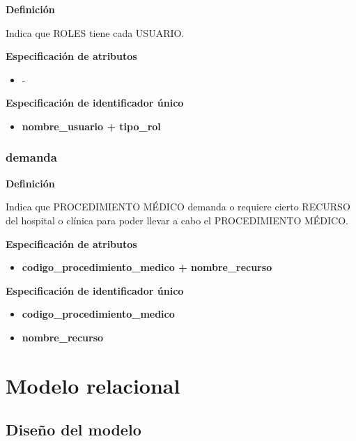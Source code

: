 \documentclass[a4paper,11pt]{article}
\begin{document}
\textbf{Definición}

Indica que ROLES tiene cada USUARIO.

\textbf{Especificación de atributos}

\begin{itemize}
\item -
\end{itemize}

\textbf{Especificación de identificador único}

\begin{itemize}

      \item \textbf{nombre\_usuario + tipo\_rol}

    
\end{itemize}

\subsubsection{\textbf{demanda}}

\textbf{Definición}

Indica que PROCEDIMIENTO MÉDICO demanda o requiere cierto RECURSO del hospital o clínica
para poder llevar a cabo el PROCEDIMIENTO MÉDICO.

\textbf{Especificación de atributos}

\begin{itemize}
     
	\item \textbf{codigo\_procedimiento\_medico + nombre\_recurso} 

\end{itemize}

\textbf{Especificación de identificador único}

\begin{itemize}

     \item \textbf{codigo\_procedimiento\_medico} 

     \item \textbf{nombre\_recurso}

\end{itemize}

\newpage

\section{\textbf{Modelo relacional\label{HToc293405831}}}

\subsection{\textbf{Diseño del modelo\label{HToc293405832}}}
\end{document}

